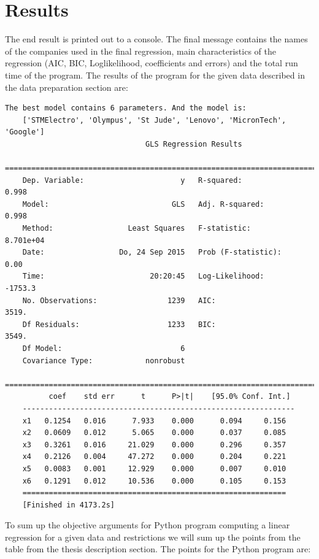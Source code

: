 \documentclass[
  twoside,
  11pt, a4paper,
  footinclude=true,
  headinclude=true,
  cleardoublepage=empty
]{scrreprt}
\begin{document}
    \section{Results}
    The end result is printed out to a console. The final message contains the names of the companies used in the final regression, main characteristics of the regression (AIC, BIC, Loglikelihood, coefficients and errors) and the total run time of the program. 
    The results of the program for the given data described in the data preparation section are:
    \begin{lstlisting}[basicstyle=\footnotesize]
    The best model contains 6 parameters. And the model is:
    ['STMElectro', 'Olympus', 'St Jude', 'Lenovo', 'MicronTech', 'Google']
                                GLS Regression Results                            
    ==========================================================================
    Dep. Variable:                      y   R-squared:               0.998
    Model:                            GLS   Adj. R-squared:          0.998
    Method:                 Least Squares   F-statistic:             8.701e+04
    Date:                 Do, 24 Sep 2015   Prob (F-statistic):      0.00
    Time:                        20:20:45   Log-Likelihood:          -1753.3
    No. Observations:                1239   AIC:                     3519.
    Df Residuals:                    1233   BIC:                     3549.
    Df Model:                           6                                         
    Covariance Type:            nonrobust                                         
    ==========================================================================
          coef    std err      t      P>|t|    [95.0% Conf. Int.]
    --------------------------------------------------------------
    x1   0.1254   0.016      7.933    0.000      0.094     0.156
    x2   0.0609   0.012      5.065    0.000      0.037     0.085
    x3   0.3261   0.016     21.029    0.000      0.296     0.357
    x4   0.2126   0.004     47.272    0.000      0.204     0.221
    x5   0.0083   0.001     12.929    0.000      0.007     0.010
    x6   0.1291   0.012     10.536    0.000      0.105     0.153
    ============================================================
    [Finished in 4173.2s]
    \end{lstlisting}
    \clearpage
    To sum up the objective arguments for Python program computing a linear regression for a given data and restrictions we will sum up the points from the table from the thesis description section.
    The points for the Python program are:
\end{document}
